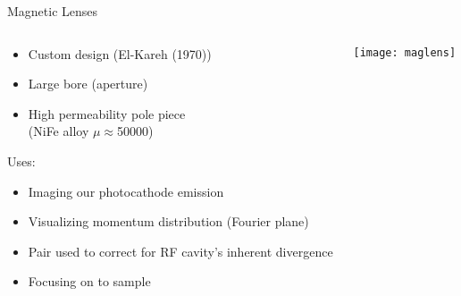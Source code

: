\begin{frame}{Magnetic Lenses}
  \begin{columns}
    \begin{column}{0.54\linewidth}
      \begin{itemize}
        \item<2-> Custom design (El-Kareh (1970))
        \item<3-> Large bore (aperture)
        \item<4-> High permeability pole piece\\(NiFe alloy $\mu \approx $50000)
      \end{itemize}
      Uses:
      \begin{itemize}
        \item<5-> Imaging our photocathode emission
        \item<6-> Visualizing momentum distribution (Fourier plane)
        \item<7-> Pair used to correct for RF cavity's inherent divergence
        \item<8-> Focusing on to sample
      \end{itemize}
    \end{column}
    \begin{column}{0.44\linewidth}
      \begin{center}
        \texttt{[image: maglens]}
      \end{center}
    \end{column}
  \end{columns}
\end{frame}

